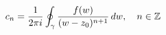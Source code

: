 \documentclass[preview]{standalone}
\begin{document}
\begin{align*}
\special{dvisvgm:raw <g id='unique000'>}c_n = \frac{1}{2\pi i}\oint_{\gamma} \frac{f(w)}{(w-z_0)^{n+1}}\,dw,\quad n \in \mathbb{Z}\special{dvisvgm:raw </g>}
\end{align*}
\end{document}
